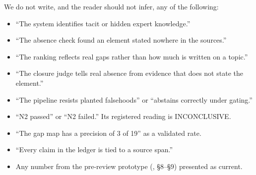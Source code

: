 \begin{findingbox}[coltitle=accent, title={\textsc{\sffamily\small\color{accent}Claims this report does not make}}]
  We do not write, and the reader should not infer, any of the following:
  \begin{itemize}[nosep, leftmargin=1.2em]
    \item \enquote{The system identifies tacit or hidden expert knowledge.}
    \item \enquote{The absence check found an element stated nowhere in the sources.}
    \item \enquote{The ranking reflects real gaps rather than how much is written on a topic.}
    \item \enquote{The closure judge tells real absence from evidence that does not state the
      element.}
    \item \enquote{The pipeline resists planted falsehoods} or \enquote{abstains correctly under
      gating.}
    \item \enquote{N2 passed} or \enquote{N2 failed.} Its registered reading is INCONCLUSIVE.
    \item \enquote{The gap map has a precision of 3 of 19} as a validated rate.
    \item \enquote{Every claim in the ledger is tied to a source span.}
    \item Any number from the pre-review prototype (,
      \S8--\S9) presented as current.
  \end{itemize}
\end{findingbox}
